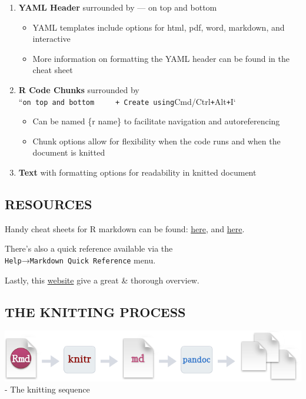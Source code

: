 \documentclass[
]{article}
\providecommand{\tightlist}{%
  \setlength{\itemsep}{0pt}\setlength{\parskip}{0pt}}
\begin{document}
\begin{enumerate}
\def\labelenumi{\arabic{enumi}.}
\tightlist
\item
  \textbf{YAML Header} surrounded by --- on top and bottom

  \begin{itemize}
  \tightlist
  \item
    YAML templates include options for html, pdf, word, markdown, and
    interactive
  \item
    More information on formatting the YAML header can be found in the
    cheat sheet
  \end{itemize}
\item
  \textbf{R Code Chunks} surrounded by
  ``\texttt{on\ top\ and\ bottom\ \ \ \ \ +\ Create\ using}Cmd/Ctrl\texttt{+}Alt\texttt{+}I`

  \begin{itemize}
  \tightlist
  \item
    Can be named \{r name\} to facilitate navigation and autoreferencing
  \item
    Chunk options allow for flexibility when the code runs and when the
    document is knitted
  \end{itemize}
\item
  \textbf{Text} with formatting options for readability in knitted
  document
\end{enumerate}

\hypertarget{resources}{%
\subsection{RESOURCES}\label{resources}}

Handy cheat sheets for R markdown can be found:
\href{https://rstudio.com/wp-content/uploads/2015/03/rmarkdown-reference.pdf}{here},
and
\href{https://raw.githubusercontent.com/rstudio/cheatsheets/master/rmarkdown-2.0.pdf}{here}.

There's also a quick reference available via the
\texttt{Help}→\texttt{Markdown\ Quick\ Reference} menu.

Lastly, this \href{https://rmarkdown.rstudio.com}{website} give a great
\& thorough overview.

\hypertarget{the-knitting-process}{%
\subsection{THE KNITTING PROCESS}\label{the-knitting-process}}

\includegraphics{../lessons/img/rmarkdownflow.png} - The knitting
sequence
\end{document}
